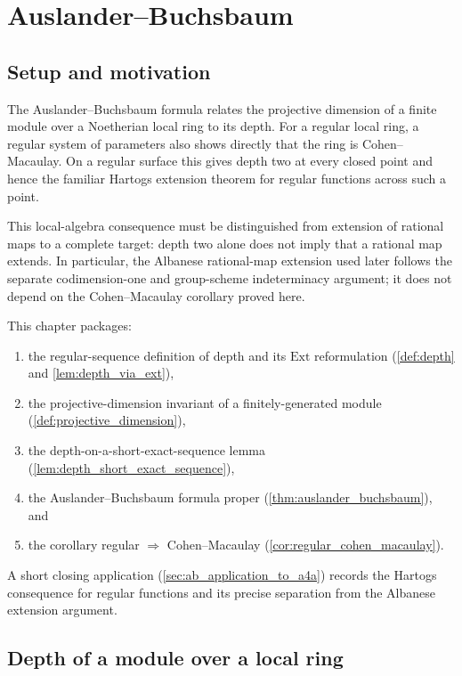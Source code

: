\chapter{Auslander--Buchsbaum}
\label{chap:Albanese_AuslanderBuchsbaum}


\section{Setup and motivation}
\label{sec:ab_setup}

The Auslander--Buchsbaum formula relates the projective dimension of a finite module over a
Noetherian local ring to its depth.  For a regular local ring, a regular system of parameters also
shows directly that the ring is Cohen--Macaulay.  On a regular surface this gives depth two at
every closed point and hence the familiar Hartogs extension theorem for regular functions across
such a point.

This local-algebra consequence must be distinguished from extension of rational maps to a
complete target: depth two alone does not imply that a rational map extends.  In particular, the
Albanese rational-map extension used later follows the separate codimension-one and group-scheme
indeterminacy argument; it does not depend on the Cohen--Macaulay corollary proved here.

This chapter packages:
\begin{enumerate}
  \item the regular-sequence definition of depth and its \(\text{Ext}\) reformulation
    (\cref{def:depth} and \cref{lem:depth_via_ext}),
  \item the projective-dimension invariant of a finitely-generated module
    (\cref{def:projective_dimension}),
  \item the depth-on-a-short-exact-sequence lemma
    (\cref{lem:depth_short_exact_sequence}),
  \item the Auslander--Buchsbaum formula proper
    (\cref{thm:auslander_buchsbaum}), and
  \item the corollary regular \(\Rightarrow\) Cohen--Macaulay
    (\cref{cor:regular_cohen_macaulay}).
\end{enumerate}
A short closing application (\cref{sec:ab_application_to_a4a}) records the Hartogs consequence
for regular functions and its precise separation from the Albanese extension argument.

\section{Depth of a module over a local ring}
\label{sec:ab_depth}


